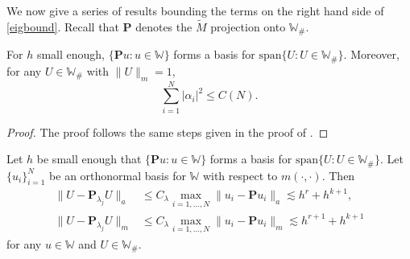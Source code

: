 \documentclass{siamart0516}
\newcommand{\W}{\mathbb{W}}
\newcommand{\bP}{\ensuremath{\boldsymbol P}}
\numberwithin{equation}{section}
\numberwithin{theorem}{section}
\numberwithin{figure}{section}
\begin{document}
We now give a series of results bounding the terms on the right hand side of \eqref{eigbound}.  Recall that $\bP$ denotes the $\widetilde M$ projection onto $\W_\#$.  %

\begin{lemma}
For $h$ small enough, $\{\bP u:u\in\W\}$ forms a basis for $\text{span}\{U:U\in\W_\#\}$. Moreover, for any $U\in \W_\#$ with $\|U\|_m=1$, %
\begin{equation}\label{coeffbound}
\sum_{i=1}^N|\alpha_i|^2\leq C(N).
\end{equation}
\end{lemma}	
\begin{proof}
The proof follows the same steps given in the proof of \cite[Lemma 5.1]{Gallistl}.
\end{proof}	
\begin{lemma} \label{P-H}	
Let $h$ be small enough that $\{\bP u:u\in\W\}$ forms a basis for $\text{span}\{U:U\in\W_\#\}$. Let $\{u_i\}_{i=1}^N$ be an orthonormal basis for $\W$ with respect to $m(\cdot, \cdot)$. Then	
	\begin{align}
		\|U - \bP_{\lambda_j}U\|_a &\leq C_\lambda \max_{i=1,...,N}\|u_i-\bP u_i\|_a  \lesssim h^r + h^{k+1},
		\label{abound}
\\		\|U - \bP_{\lambda_j}U\|_m & \leq C_\lambda \max_{i=1,...,N}\|u_i-\bP u_i\|_m \lesssim h^{r+1} + h^{k+1}
		\label{mmbound}
	\end{align}
for any $u\in\W$ and $U\in\W_\#$.
\end{lemma}
\end{document}
